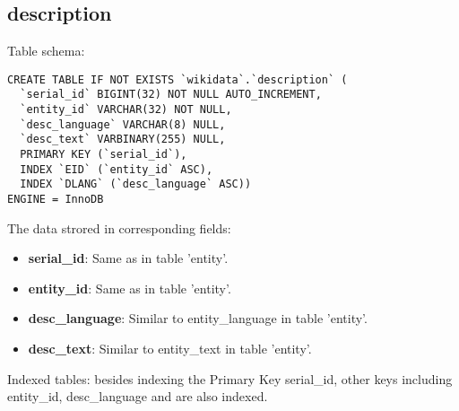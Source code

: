 \documentclass[12pt]{article}
\begin{document}
\subsection{description}
\lstset{language=SQL}
Table schema:
\begin{lstlisting}
CREATE TABLE IF NOT EXISTS `wikidata`.`description` (
  `serial_id` BIGINT(32) NOT NULL AUTO_INCREMENT,
  `entity_id` VARCHAR(32) NOT NULL,
  `desc_language` VARCHAR(8) NULL,
  `desc_text` VARBINARY(255) NULL,
  PRIMARY KEY (`serial_id`),
  INDEX `EID` (`entity_id` ASC),
  INDEX `DLANG` (`desc_language` ASC))
ENGINE = InnoDB
\end{lstlisting}
The data strored in corresponding fields:
\begin{itemize}
\item \textbf{serial\_id}: Same as in table 'entity'.
\item \textbf{entity\_id}: Same as in table 'entity'.
\item \textbf{desc\_language}: Similar to entity\_language in table 'entity'.
\item \textbf{desc\_text}: Similar to entity\_text in table 'entity'.
\end{itemize}
Indexed tables: besides indexing the Primary Key serial\_id, other keys including entity\_id, desc\_language and are also indexed.
\end{document}
